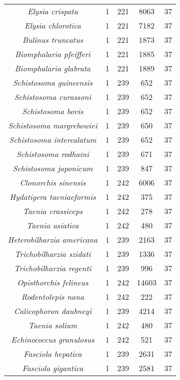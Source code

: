 \begin{longtable}[c]{|c|c|c|c|c|}
\textit{Elysia crispata}           & 1  & 221 & 8063  & 37 \\
\textit{Elysia chlorotica}         & 1  & 221 & 7182  & 37 \\
\textit{Bulinus truncatus}         & 1  & 221 & 1873  & 37 \\
\textit{Biomphalaria pfeifferi}    & 1  & 221 & 1885  & 37 \\
\textit{Biomphalaria glabrata}     & 1  & 221 & 1889  & 37 \\
\textit{Schistosoma guineensis}    & 1  & 239 & 652   & 37 \\
\textit{Schistosoma curassoni}     & 1  & 239 & 652   & 37 \\
\textit{Schistosoma bovis}         & 1  & 239 & 652   & 37 \\
\textit{Schistosoma margrebowiei}  & 1  & 239 & 650   & 37 \\
\textit{Schistosoma intercalatum}  & 1  & 239 & 652   & 37 \\
\textit{Schistosoma rodhaini}      & 1  & 239 & 671   & 37 \\
\textit{Schistosoma japonicum}     & 1  & 239 & 847   & 37 \\
\textit{Clonorchis sinensis}       & 1  & 242 & 6006  & 37 \\
\textit{Hydatigera taeniaeformis}  & 1  & 242 & 375   & 37 \\
\textit{Taenia crassiceps}         & 1  & 242 & 278   & 37 \\
\textit{Taenia asiatica}           & 1  & 242 & 480   & 37 \\
\textit{Heterobilharzia americana} & 1  & 239 & 2163  & 37 \\
\textit{Trichobilharzia szidati}   & 1  & 239 & 1336  & 37 \\
\textit{Trichobilharzia regenti}   & 1  & 239 & 996   & 37 \\
\textit{Opisthorchis felineus}     & 1  & 242 & 14603 & 37 \\
\textit{Rodentolepis nana}         & 1  & 242 & 222   & 37 \\
\textit{Calicophoron daubneyi}     & 1  & 239 & 4214  & 37 \\
\textit{Taenia solium}             & 1  & 242 & 480   & 37 \\
\textit{Echinococcus granulosus}   & 1  & 242 & 521   & 37 \\
\textit{Fasciola hepatica}         & 1  & 239 & 2631  & 37 \\
\textit{Fasciola gigantica}        & 1  & 239 & 2581  & 37 \\

\end{longtable}
